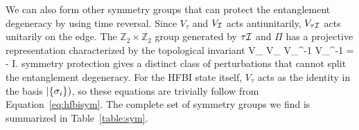 

We can also form other symmetry groups that can protect the entanglement degeneracy by using
time reversal. 
Since $V_{\tau}$ and $V_{\mathcal{I}}$ acts antiunitarily, $V_{\tau \mathcal{I}}$ acts
unitarily on the edge. The $\mathbb{Z}_2 \times \mathbb{Z}_2$ group generated by
$\tau \mathcal{I}$ and $\varPi$ has a projective representation characterized by the 
topological invariant
\beq
V_{\varPi} V_{\tau \I} V_{\varPi}^{-1} V_{\tau \I}^{-1}
 = - I.
\eeq
 symmetry protection gives a distinct class of perturbations that cannot
split the entanglement degeneracy. For the HFBI state itself, $V_{\tau}$ acts as the identity in 
the basis $\left |\{\sigma_i\} \right )$, so these equations are trivially follow from Equation~\ref{eq:hfbisym}. 
The complete set of symmetry groups we find is summarized in Table~\ref{table:sym}.


